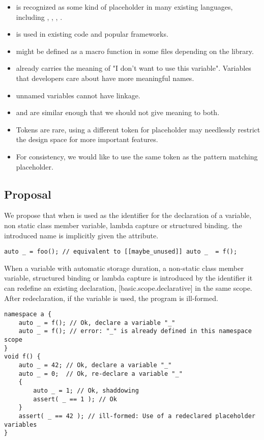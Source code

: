 \documentclass{wg21}
\begin{document}
\begin{itemize}
\item \tcode{_} is recognized as some kind of placeholder in many existing languages, including , , , .
\item \tcode{_} is used in existing code and popular frameworks.
\item \tcode{_} might be defined as a macro function in some files depending on the  library.
\item \tcode{_} already carries the meaning of "I don't want to use this variable". Variables that developers care about have more meaningful names.
\item \tcode{_} unnamed variables cannot have linkage.
\item \tcode{_} and \tcode{__} are similar enough that we should not give meaning to both.
\item Tokens are rare, using a different token for placeholder may needlessly restrict the design space for more important features.
\item For consistency, we would like to use the same token as the pattern matching placeholder.
\end{itemize}

\subsection{Proposal}

We propose that when \tcode{_} is used as the identifier for the declaration of a variable, non static class member variable,
lambda capture or structured binding.
the introduced name is implicitly given the  attribute.

\begin{example}
\begin{lstlisting}[style=color]
auto _ = foo(); // equivalent to [[maybe_unused]] auto _  = f();
\end{lstlisting}
\end{example}

When a variable with automatic storage duration, a non-static class member variable, structured binding or lambda capture is introduced by the identifier \tcode{_}
it can redefine an existing declaration, [basic.scope.declarative] in the same scope. After redeclaration, if the variable is used, the program is ill-formed.

\begin{example}
\begin{lstlisting}[style=color]
namespace a {
    auto _ = f(); // Ok, declare a variable "_"
    auto _ = f(); // error: "_" is already defined in this namespace scope
}
void f() {
    auto _ = 42; // Ok, declare a variable "_"
    auto _ = 0;  // Ok, re-declare a variable "_"
    {
        auto _ = 1; // Ok, shaddowing
        assert( _ == 1 ); // Ok
    }
    assert( _ == 42 ); // ill-formed: Use of a redeclared placeholder variables
}
\end{lstlisting}
\end{example}
\end{document}
